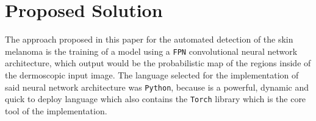 \begin{table}[h]
  \begin{center}
  \end{center}
  \label{Tab:comp_1}
\end{table}

\section{Proposed Solution}
The approach proposed in this paper for the automated detection of the skin melanoma is the training of a model using a \texttt{FPN} convolutional neural network architecture, which output would be the probabilistic map of the regions inside of the dermoscopic input image. The language selected for the implementation of said neural network architecture was \texttt{Python}, because is a powerful, dynamic and quick to deploy language which also contains the \texttt{Torch} library which is the core tool of the implementation.

